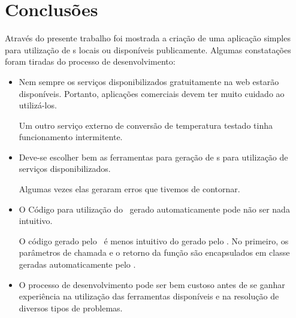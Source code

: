 %

\chapter{Conclusões}

Através do presente trabalho foi mostrada a criação de uma aplicação simples
para utilização de \WebService s locais ou disponíveis publicamente.  Algumas
constatações foram tiradas do processo de desenvolvimento:

\begin{itemize}
  \item Nem sempre os serviços disponibilizados gratuitamente na web estarão
    disponíveis. Portanto, aplicações comerciais devem ter muito cuidado ao
    utilizá-los. 
    
    Um outro serviço externo de conversão de temperatura testado tinha
    funcionamento intermitente. 
  \item Deve-se escolher bem as ferramentas para geração de \proxy s para
    utilização de serviços disponibilizados. 
    
    Algumas vezes elas geraram erros
    que tivemos de contornar.
  \item O Código para utilização do \proxy\ gerado automaticamente pode não ser
    nada intuitivo. 
    
    O código gerado pelo \Eclipsev\ é menos intuitivo do gerado
    pelo \NetBeansv. No primeiro, os parâmetros de chamada e o retorno da função
    são encapsulados em classe geradas automaticamente pelo \ApacheAxisDois.
  
  \item O processo de desenvolvimento pode ser bem custoso antes de se ganhar
    experiência na utilização das ferramentas disponíveis e na resolução de
    diversos tipos de problemas.
\end{itemize}

